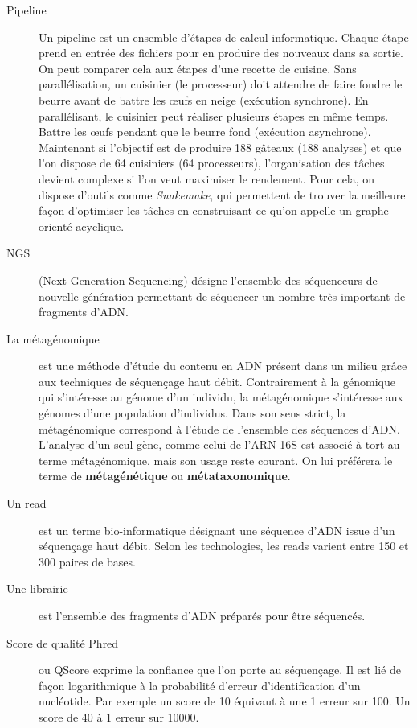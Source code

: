 \documentclass[12pt,a4paper]{article}
\begin{document}
\begin{description}
\item[Pipeline] 
Un pipeline est un ensemble d'étapes de calcul informatique. Chaque étape prend en entrée des fichiers pour en produire des nouveaux dans sa sortie. On peut comparer cela aux étapes d'une recette de cuisine. Sans parallélisation, un cuisinier (le processeur) doit attendre de faire fondre le beurre avant de battre les œufs en neige (exécution synchrone). En parallélisant, le cuisinier peut réaliser plusieurs étapes en même temps. Battre les œufs pendant que le beurre fond (exécution asynchrone). 
Maintenant si l'objectif est de produire 188 gâteaux (188 analyses) et que l'on dispose de 64 cuisiniers (64 processeurs), l'organisation des tâches devient complexe si l'on veut maximiser le rendement. Pour cela, on dispose d'outils comme \textit{Snakemake}\cite{Koster2012}, qui permettent de trouver la meilleure façon d'optimiser les tâches en construisant ce qu'on appelle un graphe orienté acyclique.

\item[NGS](Next Generation Sequencing) désigne l'ensemble des séquenceurs de nouvelle génération permettant de séquencer un nombre très important de fragments d'ADN. 

\item[La métagénomique] est une méthode d’étude du contenu en ADN présent dans un milieu grâce aux techniques de séquençage haut débit. Contrairement à la génomique qui s’intéresse au génome d’un individu, la métagénomique s’intéresse aux génomes d’une population d’individus.
Dans son sens strict, la métagénomique correspond à l’étude de l’ensemble des séquences d'ADN. L’analyse d’un seul gène, comme celui de l’ARN 16S est associé à tort au terme métagénomique, mais son usage reste courant. On lui préférera le terme de \textbf{métagénétique} ou \textbf{métataxonomique}.


\item[Un read] est un terme bio-informatique désignant une séquence d’ADN issue d’un séquençage haut débit. Selon les technologies, les reads varient entre 150 et 300 paires de bases.

\item[Une librairie] est l'ensemble des fragments d'ADN préparés pour être séquencés. 

\item[Score de qualité Phred] ou QScore exprime la confiance que l'on porte au séquençage. Il est lié de façon logarithmique à la probabilité d'erreur d'identification d'un nucléotide.  Par exemple un score de 10 équivaut à une 1 erreur sur 100. Un score de 40 à 1 erreur sur 10000.



\end{description}
\end{document}
